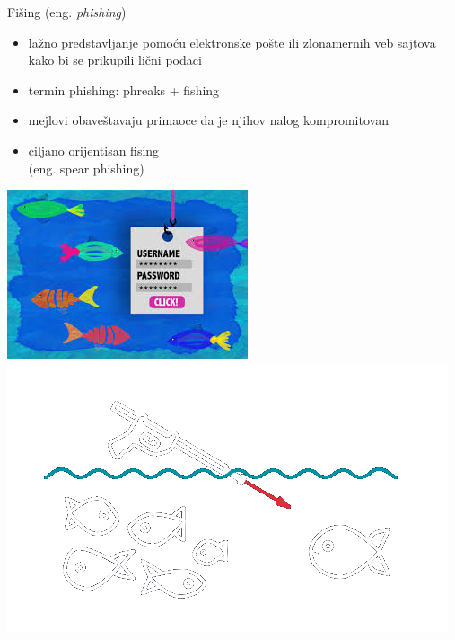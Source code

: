     \begin{frame}{Fišing (eng. \textit{phishing})}
        
        \noindent\begin{minipage}{0.55\linewidth}
            \begin{itemize}
                \item lažno predstavljanje pomoću elektronske pošte ili zlonamernih veb sajtova kako bi se prikupili lični podaci
                \item termin phishing: phreaks + fishing
                \item mejlovi obaveštavaju primaoce da je njihov nalog kompromitovan
                \item ciljano orijentisan fising \\(eng. spear phishing)
            \end{itemize}
        \end{minipage}
        \hfill
        \begin{minipage}[t]{0.4\linewidth}
            \centering
            \includegraphics[scale = 0.3]{images/phishing1.jpeg}
            \vspace{0.5cm}
            \includegraphics[scale = 0.3]{images/spear_phishing_transparent.png}
        \end{minipage}
    \end{frame}
    
